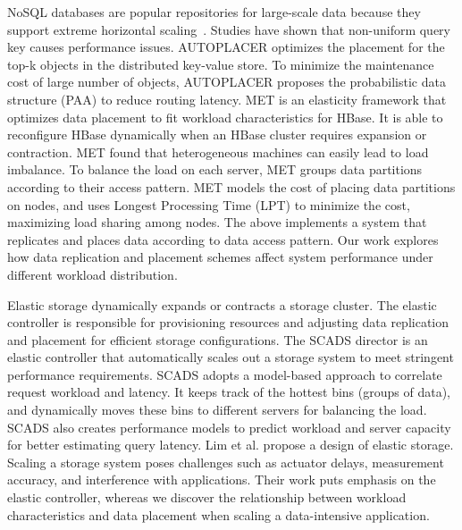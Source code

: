 NoSQL databases are popular repositories for large-scale data
because they support extreme horizontal
scaling~\cite{Lakshman2010,Chang2008,hbase,mongodb}.
Studies have shown that non-uniform query key
causes performance issues.
AUTOPLACER \cite{Rodrigues2013} optimizes the placement
for the top-k objects in the distributed key-value store.
To minimize the maintenance cost of large number of objects,
AUTOPLACER proposes the probabilistic data structure (PAA)
to reduce routing latency.
MET \cite{Cruz2013} is an elasticity framework that 
optimizes data placement to fit workload characteristics for HBase.
It is able to reconfigure HBase dynamically when an HBase cluster
requires expansion or contraction.
MET found that heterogeneous machines can easily lead to load imbalance.
To balance the load on each server, MET groups data partitions
according to their access pattern.
MET models the cost of placing data partitions on nodes, and
uses Longest Processing Time (LPT) to minimize the cost,
maximizing load sharing among nodes.
The above implements a system that replicates and places data according to
data access pattern.
Our work explores how data replication and placement schemes
affect system performance under different workload distribution.



Elastic storage dynamically expands or contracts a storage cluster.
The elastic controller is responsible for
provisioning resources and adjusting data replication and placement
for efficient storage configurations.
The SCADS director \cite{Trushkowsky2011} is an elastic controller
that automatically scales out a storage system to meet stringent
performance requirements. 
SCADS adopts a model-based approach to correlate request workload and
latency. 
It keeps track of the hottest bins (groups of data), and
dynamically moves these bins to different servers for balancing the load.
SCADS also creates performance models to predict workload and server capacity
for better estimating query latency.
Lim et al. propose a design of elastic storage\cite{Lim2010}.
Scaling a storage system poses challenges such as actuator delays,
measurement accuracy, and interference with applications.
Their work puts emphasis on the elastic controller, whereas
we discover the relationship between
workload characteristics and data placement
when scaling a data-intensive application.

